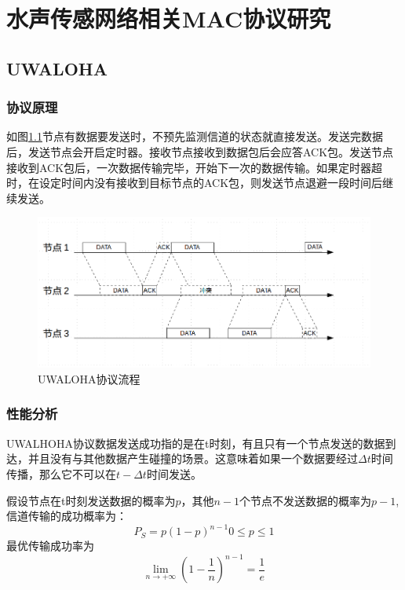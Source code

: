 \chapter{水声传感网络相关MAC协议研究 }
\section{UWALOHA}
\subsection{协议原理}
如图\ref{fig2}节点有数据要发送时，不预先监测信道的状态就直接发送。发送完数据后，发送节点会开启定时器。接收节点接收到数据包后会应答ACK包。发送节点接收到ACK包后，一次数据传输完毕，开始下一次的数据传输。如果定时器超时，在设定时间内没有接收到目标节点的ACK包，则发送节点退避一段时间后继续发送。

\begin{figure}[ht]
	\centering
	\includegraphics[scale=0.4]{figures/aloha.png}
	\caption{
		UWALOHA协议流程
	}
	\label{fig2}
\end{figure}

\subsection{性能分析}
UWALHOHA协议数据发送成功指的是在t时刻，有且只有一个节点发送的数据到达，并且没有与其他数据产生碰撞的场景。这意味着如果一个数据要经过$\Delta t$时间传播，那么它不可以在$t-\Delta t$时间发送\cite{vieira2006analysis}。

假设节点在t时刻发送数据的概率为$p$，其他$n-1$个节点不发送数据的概率为$p-1$,信道传输的成功概率为：
\begin{equation}
P_S=p(1-p)^{n-1}   0\le p\le 1
\end{equation}
最优传输成功率为
\begin{equation}
\lim\limits_{n\to+\infty} (1-\frac{1}{n})^{n-1}=\frac{1}{e}
\end{equation}
